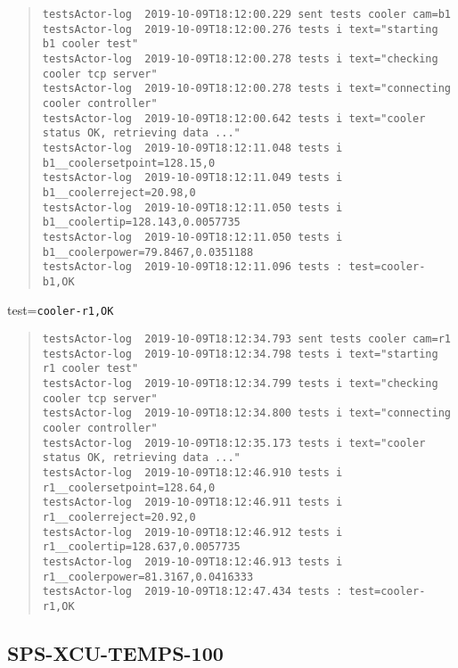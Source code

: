 \begin{quote}
\begin{tiny}
\begin{verbatim}
testsActor-log  2019-10-09T18:12:00.229 sent tests cooler cam=b1
testsActor-log  2019-10-09T18:12:00.276 tests i text="starting b1 cooler test"
testsActor-log  2019-10-09T18:12:00.278 tests i text="checking cooler tcp server"
testsActor-log  2019-10-09T18:12:00.278 tests i text="connecting cooler controller"
testsActor-log  2019-10-09T18:12:00.642 tests i text="cooler status OK, retrieving data ..."
testsActor-log  2019-10-09T18:12:11.048 tests i b1__coolersetpoint=128.15,0
testsActor-log  2019-10-09T18:12:11.049 tests i b1__coolerreject=20.98,0
testsActor-log  2019-10-09T18:12:11.050 tests i b1__coolertip=128.143,0.0057735
testsActor-log  2019-10-09T18:12:11.050 tests i b1__coolerpower=79.8467,0.0351188
testsActor-log  2019-10-09T18:12:11.096 tests : test=cooler-b1,OK
\end{verbatim}
\end{tiny}
\end{quote}

\noindent test=\texttt{cooler-r1,OK}

\begin{quote}
\begin{tiny}
\begin{verbatim}
testsActor-log  2019-10-09T18:12:34.793 sent tests cooler cam=r1
testsActor-log  2019-10-09T18:12:34.798 tests i text="starting r1 cooler test"
testsActor-log  2019-10-09T18:12:34.799 tests i text="checking cooler tcp server"
testsActor-log  2019-10-09T18:12:34.800 tests i text="connecting cooler controller"
testsActor-log  2019-10-09T18:12:35.173 tests i text="cooler status OK, retrieving data ..."
testsActor-log  2019-10-09T18:12:46.910 tests i r1__coolersetpoint=128.64,0
testsActor-log  2019-10-09T18:12:46.911 tests i r1__coolerreject=20.92,0
testsActor-log  2019-10-09T18:12:46.912 tests i r1__coolertip=128.637,0.0057735
testsActor-log  2019-10-09T18:12:46.913 tests i r1__coolerpower=81.3167,0.0416333
testsActor-log  2019-10-09T18:12:47.434 tests : test=cooler-r1,OK
\end{verbatim}
\end{tiny}
\end{quote}

\subsection{SPS-XCU-TEMPS-100}
\label{sec:tc-100}

